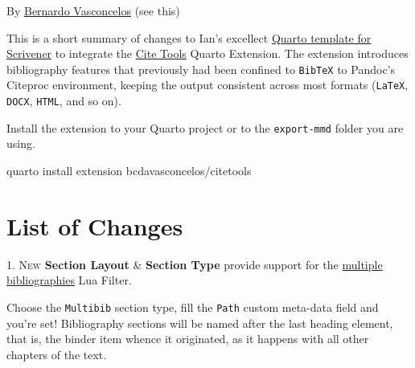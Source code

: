 \documentclass[
  12pt,
  a4paper,
  oneside]{scrbook}
\begin{document}
\protect\hypertarget{scriv27}{}{}

By \href{https://github.com/bcdavasconcelos}{Bernardo Vasconcelos} (see
this)

This is a short summary of changes to Ian's excellect
\href{http://forum.literatureandlatte.com/t/scrivener-quarto-a-technical-academic-publishing-workflow/129769?u=bernardo_vasconcelos}{Quarto
template for Scrivener} to integrate the
\href{http://bcdavasconcelos.github.io/citetools/}{Cite Tools} Quarto
Extension. The extension introduces bibliography features that
previously had been confined to \texttt{BibTeX} to Pandoc's Citeproc
environment, keeping the output consistent across most formats
(\texttt{LaTeX}, \texttt{DOCX}, \texttt{HTML}, and so on).

Install the extension to your Quarto project or to the
\texttt{export-mmd} folder you are using.

quarto install extension bcdavasconcelos/citetools

\hypertarget{list-of-changes}{%
\section{List of Changes}\label{list-of-changes}}

\protect\hypertarget{scriv28}{}{}

\textsc{1. New} \textbf{Section Layout} \& \textbf{Section Type} provide
support for the
\href{https://github.com/pandoc/lua-filters/tree/master/multiple-bibliographies}{multiple
bibliographies} Lua Filter.

\begin{tcolorbox}[enhanced jigsaw, toprule=.15mm, rightrule=.15mm, colbacktitle=quarto-callout-tip-color!10!white, title=\textcolor{quarto-callout-tip-color}{\faLightbulb}\hspace{0.5em}{Tip}, breakable, colback=white, leftrule=.75mm, titlerule=0mm, colframe=quarto-callout-tip-color-frame, bottomtitle=1mm, opacityback=0, coltitle=black, toptitle=1mm, arc=.35mm, left=2mm, bottomrule=.15mm, opacitybacktitle=0.6]

Choose the \texttt{Multibib} section type, fill the \texttt{Path} custom
meta-data field and you're set! Bibliography sections will be named
after the last heading element, that is, the binder item whence it
originated, as it happens with all other chapters of the text.

\end{tcolorbox}
\end{document}
